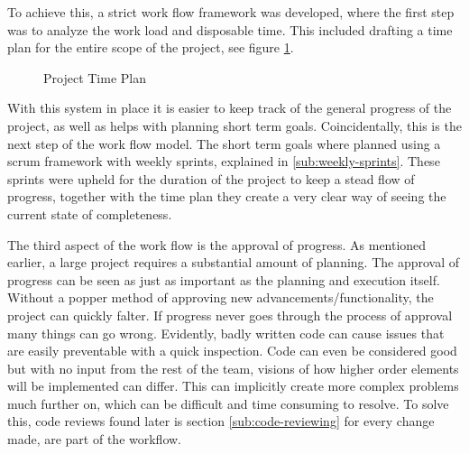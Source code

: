     To achieve this, a strict work flow framework was developed, where the first step was to analyze the work load and disposable time. This included drafting a time plan for the entire scope of the project, see figure \ref{fig:time-plan}. 

    \begin{figure}[H]
        \centering
        \caption{Project Time Plan}
        \label{fig:time-plan}
    \end{figure}

    With this system in place it is easier to keep track of the general progress of the project, as well as helps with planning short term goals. Coincidentally, this is the next step of the work flow model. The short term goals where planned using a scrum framework with weekly sprints, explained in \ref{sub:weekly-sprints}. These sprints were upheld for the duration of the project to keep a stead flow of progress, together with the time plan they create a very clear way of seeing the current state of completeness. 

    The third aspect of the work flow is the approval of progress. As mentioned earlier, a large project requires a substantial amount of planning. The approval of progress can be seen as just as important as the planning and execution itself. Without a popper method of approving new advancements/functionality, the project can quickly falter. If progress never goes through the process of approval many things can go wrong. Evidently, badly written code can cause issues that are easily preventable with a quick inspection. Code can even be considered good but with no input from the rest of the team, visions of how higher order elements will be implemented can differ. This can implicitly create  more complex problems much further on, which can be difficult and time consuming to resolve. To solve this, code reviews found later is section \ref{sub:code-reviewing} for every change made, are part of the workflow.  

